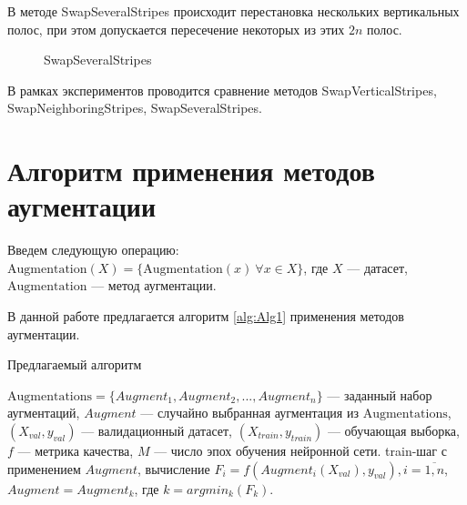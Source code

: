 \documentclass[12pt, fleqn]{article}
\begin{document}
В методе SwapSeveralStripes происходит перестановка нескольких вертикальных полос, при этом допускается пересечение некоторых из этих $2 n$ полос.
\begin{figure}[ht!]
\caption{SwapSeveralStripes}
\label{fig:i2}
\end{figure}
В рамках экспериментов проводится сравнение методов SwapVerticalStripes, SwapNeighboringStripes, SwapSeveralStripes.


\newpage
\section{Алгоритм применения методов аугментации}

Введем следующую операцию: \newline
$\text{Augmentation}(X) = \{\text{Augmentation}(x) \ \forall x \in X\}$, где $X$ --- датасет, \newline $\text{Augmentation}$ --- метод аугментации.

В данной работе предлагается алгоритм \ref{alg:Alg1} применения методов аугментации.

\algrenewcommand{}
\algrenewcommand{}

\begin{algorithm}
\caption{Предлагаемый алгоритм}\label{alg:Alg1}
\begin{algorithmic}
\State $\text{Augmentations} = \{Augment_1, Augment_2, ..., Augment_n\}$ --- заданный набор аугментаций,
\State $Augment$ --- случайно выбранная аугментация  из $\text{Augmentations}$,
\State $(X_{val}, y_{val})$ --- валидационный датасет, 
\State $(X_{train}, y_{train})$ --- обучающая выборка,
\State $f$ --- метрика качества,
\State $M$ --- число эпох обучения нейронной сети.
\State train-шаг с применением $Augment$,
\State вычисление $F_i = f(Augment_i(X_{val}), y_{val}), i = \overline{1,n}$,
\State $Augment = Augment_k$, где $k = argmin_k(F_k)$.
\EndFor
\end{algorithmic}
\end{algorithm}
\end{document}
